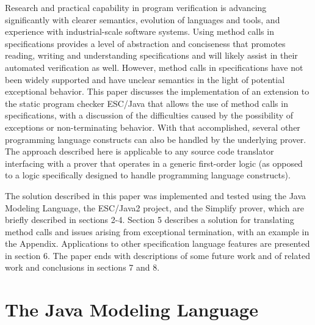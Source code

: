 \documentclass{sig-alternate2}
\begin{document}
Research and practical capability in program verification is advancing
significantly with clearer semantics, evolution of languages and tools,
and experience with industrial-scale software systems.
Using method calls in specifications provides a level of abstraction 
and conciseness that
promotes reading, writing and understanding specifications and will 
likely assist in their automated verification as well.  However, method
calls in specifications have not been widely supported and have
unclear semantics in the light of potential exceptional behavior.
This paper discusses the implementation
of an extension to the static program checker ESC/Java that allows the use of method calls in
specifications, with a discussion of the difficulties caused by the possibility of exceptions or
non-terminating behavior.  With that accomplished, several other programming
language constructs can also be handled by the underlying prover.
The approach described here is applicable to any source code translator
interfacing with a prover that operates in a generic first-order 
logic (as opposed to a logic specifically designed to handle programming language
constructs).

The solution described in this paper was implemented 
and tested using the Java Modeling
Language, the ESC/Java2 project, and the Simplify prover,
which are briefly described in sections 2-4.
Section 5 describes a solution for translating method calls and issues 
arising from exceptional termination, with an example in the Appendix.
Applications to other specification language features are presented in section 6.
The paper ends with descriptions of some future work
and of related work and conclusions in sections 7 and 8.


\section{The Java Modeling Language}
\end{document}
